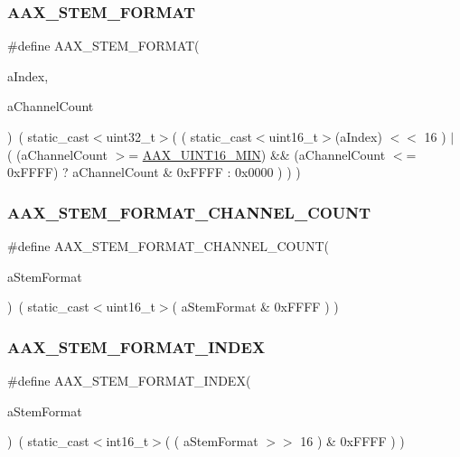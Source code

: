 \subsubsection{\texorpdfstring{AAX\_STEM\_FORMAT}{AAX\_STEM\_FORMAT}}
{\footnotesize\ttfamily \#define A\+A\+X\+\_\+\+S\+T\+E\+M\+\_\+\+F\+O\+R\+M\+AT(\begin{DoxyParamCaption}\item[{}]{a\+Index,  }\item[{}]{a\+Channel\+Count }\end{DoxyParamCaption})~( static\+\_\+cast$<$uint32\+\_\+t$>$( ( static\+\_\+cast$<$uint16\+\_\+t$>$(a\+Index) $<$$<$ 16 ) $\vert$ ( (a\+Channel\+Count $>$= \mbox{\hyperlink{a00491_a8ceb2c21f1d6aa31c5f90b0a03d5d7e6}{A\+A\+X\+\_\+\+U\+I\+N\+T16\+\_\+\+M\+IN}}) \&\& (a\+Channel\+Count $<$= 0x\+F\+F\+F\+F) ? a\+Channel\+Count \& 0x\+F\+F\+F\+F \+: 0x0000 ) ) )}

\mbox{\label{a00491_a12f0ee49594dcd2950f00115baef70ae}} 
\subsubsection{\texorpdfstring{AAX\_STEM\_FORMAT\_CHANNEL\_COUNT}{AAX\_STEM\_FORMAT\_CHANNEL\_COUNT}}
{\footnotesize\ttfamily \#define A\+A\+X\+\_\+\+S\+T\+E\+M\+\_\+\+F\+O\+R\+M\+A\+T\+\_\+\+C\+H\+A\+N\+N\+E\+L\+\_\+\+C\+O\+U\+NT(\begin{DoxyParamCaption}\item[{}]{a\+Stem\+Format }\end{DoxyParamCaption})~( static\+\_\+cast$<$uint16\+\_\+t$>$( a\+Stem\+Format \& 0x\+F\+F\+F\+F ) )}

\mbox{\label{a00491_adaa26e9aff018ff76ca6ce23edb511e5}} 
\subsubsection{\texorpdfstring{AAX\_STEM\_FORMAT\_INDEX}{AAX\_STEM\_FORMAT\_INDEX}}
{\footnotesize\ttfamily \#define A\+A\+X\+\_\+\+S\+T\+E\+M\+\_\+\+F\+O\+R\+M\+A\+T\+\_\+\+I\+N\+D\+EX(\begin{DoxyParamCaption}\item[{}]{a\+Stem\+Format }\end{DoxyParamCaption})~( static\+\_\+cast$<$int16\+\_\+t$>$( ( a\+Stem\+Format $>$$>$ 16 ) \& 0x\+F\+F\+F\+F ) )}



